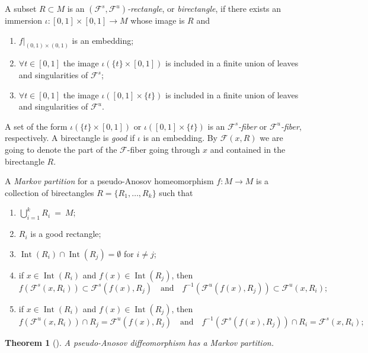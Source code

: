 \documentclass[oneside]{amsart}
\def\Int{\operatorname{Int}}
\newtheorem{thm}{Theorem}
\begin{document}
A subset $R \subset M$ is an \emph{$(\mathcal{F}^s, \mathcal{F}^u)$-rectangle}, or \emph{birectangle},
if there exists an immersion $\iota: [0,1] \times [0,1] \to M$ whose image is $R$ and
\begin{enumerate}
\item[(a)] $f|_{(0,1) \times (0,1)}$ is an embedding;
\item[(b)] $\forall t \in [0,1]$ the image $\iota(\{t\} \times [0,1])$ is included in a finite union
           of leaves and singularities of $\mathcal{F}^s$;
\item[(c)] $\forall t \in [0,1]$ the image $\iota([0,1] \times \{t\})$ is included in a finite union
           of leaves and singularities of $\mathcal{F}^u$.
\end{enumerate}
A set of the form $\iota(\{t\} \times [0,1])$ or $\iota([0,1] \times \{t\})$ is an \emph{$\mathcal{F}^s$-fiber}
or \emph{$\mathcal{F}^u$-fiber}, respectively.
A birectangle is \emph{good} if $\iota$ is an embedding.
By $\mathcal{F}(x,R)$ we are going to denote the part of the $\mathcal{F}$-fiber
going through $x$ and contained in the birectangle $R$.

A \emph{Markov partition} for a pseudo-Anosov homeomorphism $f: M \to M$ is a collection of birectangles
$R = \{R_1, \ldots, R_k\}$ such that
\begin{enumerate}
\item[(a)] $\bigcup_{i=1}^k R_i \ = \ M$;
\item[(b)] $R_i$ is a good rectangle;
\item[(c)] $\Int(R_i) \cap \Int(R_j) = \emptyset$ for $i \neq j$;
\item[(d)] if $x \in \Int(R_i)$ and $f(x) \in \Int(R_j)$, then
\begin{equation*}
  f(\mathcal{F}^s(x, R_i)) \subset \mathcal{F}^s(f(x), R_j) \quad \text{and} \quad
  f^{-1}(\mathcal{F}^u(f(x), R_j)) \subset \mathcal{F}^u(x, R_i);
\end{equation*}
\item[(e)] if $x \in \Int(R_i)$ and $f(x) \in \Int(R_j)$, then
\begin{equation*}
  f(\mathcal{F}^u(x, R_i)) \cap R_j = \mathcal{F}^u(f(x), R_j) \quad \text{and} \quad
  f^{-1}(\mathcal{F}^s(f(x), R_j)) \cap R_i = \mathcal{F}^s(x, R_i);
\end{equation*}
\end{enumerate}

\begin{thm}[]
  A pseudo-Anosov diffeomorphism has a Markov partition.
\end{thm}
\end{document}
